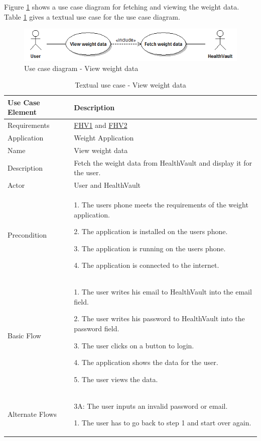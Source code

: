 Figure \ref{figure:use-case-diagram-view-weight} shows a use case diagram for fetching and viewing the weight data.
Table \ref{table:use-case-view-weight-data} gives a textual use case for the use case diagram.

\begin{figure}[H]
\centering
\includegraphics[scale=0.75]{../Figures/use-case-diagram-view-weight.png}
\caption{Use case diagram - View weight data}
\label{figure:use-case-diagram-view-weight}
\end{figure}

\begin{table}[H]
\begin{center}
\begin{tabular}{ l | p{10cm} }
  \hline
  \textbf{Use Case Element} & \textbf{Description} \\ \hline\hline
  Requirements & \hyperref[table:reqweight]{FHV1} and \hyperref[table:reqweight]{FHV2}\\ \hline
  Application & Weight Application \\ \hline
  Name & View weight data \\ \hline
  Description & Fetch the weight data from HealthVault and display it for the user. \\ \hline
  Actor & User and HealthVault \\ \hline
  Precondition &
    \par 1. The users phone meets the requirements of the weight application.
  	\par 2. The application is installed on the users phone.
  	\par 3. The application is running on the users phone.
  	\par 4. The application is connected to the internet.
  \\ \hline
  Basic Flow & 
  	\par 1. The user writes his email to HealthVault into the email field.
  	\par 2. The user writes his password to HealthVault into the password field.
  	\par 3. The user clicks on a button to login.
  	\par 4. The application shows the data for the user.
  	\par 5. The user views the data.
  \\ \hline
  Alternate Flows & 
  	\par 3A: The user inputs an invalid password or email.
  	\par\hspace{15pt} 1. The user has to go back to step 1 and start over again.
  \\ \hline
\end{tabular}
\end{center}
\caption{Textual use case - View weight data}
\label{table:use-case-view-weight-data}
\end{table}

